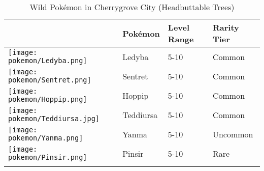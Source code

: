 \begin{longtable}{||l l l l||}%
\hline%
\rowcolor{GroundColor}%
&Pokémon&Level Range&Rarity Tier\\%
\hline%
\endhead%
\hline%
\rowcolor{GroundColor}%
\texttt{[image: pokemon/Ledyba.png]}&Ledyba&5{-}10&\textcolor{black}{%
Common%
}\\%
\hline%
\rowcolor{GroundColor}%
\texttt{[image: pokemon/Sentret.png]}&Sentret&5{-}10&\textcolor{black}{%
Common%
}\\%
\hline%
\rowcolor{GroundColor}%
\texttt{[image: pokemon/Hoppip.png]}&Hoppip&5{-}10&\textcolor{black}{%
Common%
}\\%
\hline%
\rowcolor{GroundColor}%
\texttt{[image: pokemon/Teddiursa.jpg]}&Teddiursa&5{-}10&\textcolor{black}{%
Common%
}\\%
\hline%
\rowcolor{GroundColor}%
\texttt{[image: pokemon/Yanma.png]}&Yanma&5{-}10&\textcolor{OliveGreen}{%
Uncommon%
}\\%
\hline%
\rowcolor{GroundColor}%
\texttt{[image: pokemon/Pinsir.png]}&Pinsir&5{-}10&\textcolor{RedOrange}{%
Rare%
}\\%
\hline%
\caption{Wild Pokémon in Cherrygrove City (Headbuttable Trees)}%
\label{tab:CherrygroveCityHeadbuttableTrees}%
\end{longtable}